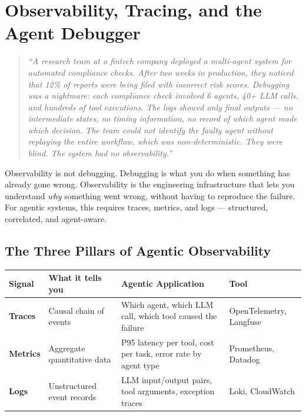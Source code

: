 \chapter{Observability, Tracing, and the Agent Debugger}

\begin{quote}
\textit{``A research team at a fintech company deployed a multi-agent system for automated compliance checks. After two weeks in production, they noticed that 12\% of reports were being filed with incorrect risk scores. Debugging was a nightmare: each compliance check involved 6 agents, 40+ LLM calls, and hundreds of tool executions. The logs showed only final outputs — no intermediate states, no timing information, no record of which agent made which decision. The team could not identify the faulty agent without replaying the entire workflow, which was non-deterministic. They were blind. The system had no observability.''}
\end{quote}

Observability is not debugging. Debugging is what you do when something has already gone wrong. Observability is the engineering infrastructure that lets you understand \textit{why} something went wrong, without having to reproduce the failure. For agentic systems, this requires traces, metrics, and logs — structured, correlated, and agent-aware.

\section{The Three Pillars of Agentic Observability}

\begin{center}
\begin{tabular}{|l|p{3.2cm}|p{3.2cm}|p{2.4cm}|}
\hline
\textbf{Signal} & \textbf{What it tells you} & \textbf{Agentic Application} & \textbf{Tool} \\
\hline
\textbf{Traces} & Causal chain of events & Which agent, which LLM call, which tool caused the failure & OpenTelemetry, Langfuse \\
\hline
\textbf{Metrics} & Aggregate quantitative data & P95 latency per tool, cost per task, error rate by agent type & Prometheus, Datadog \\
\hline
\textbf{Logs} & Unstructured event records & LLM input/output pairs, tool arguments, exception traces & Loki, CloudWatch \\
\hline
\end{tabular}
\end{center}

